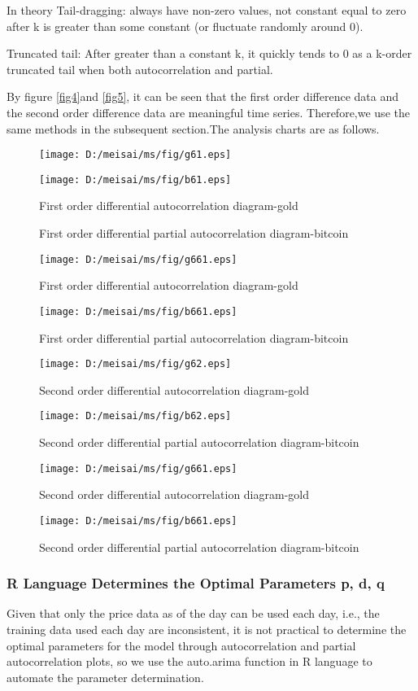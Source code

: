 \documentclass{mcmthesis}
\begin{document}
In theory
Tail-dragging: always have non-zero values, not constant equal to zero after k is greater than some constant (or fluctuate randomly around 0).

Truncated tail: After greater than a constant k, it quickly tends to 0 as a k-order truncated tail when both autocorrelation and partial.

By figure \ref{fig4}and \ref{fig5}, it can be seen that the first order difference data and the second order difference data are meaningful time series.
Therefore,we use the same methods in the subsequent section.The analysis charts are as follows.

\begin{figure}[htbp]
  \centering
  \texttt{[image: D:/meisai/ms/fig/g61.eps]}
  \caption{First order differential autocorrelation diagram-gold}
  \texttt{[image: D:/meisai/ms/fig/b61.eps]}
\end{figure}
\begin{figure}[htbp]
  \caption{First order differential partial autocorrelation diagram-bitcoin} 
  \texttt{[image: D:/meisai/ms/fig/g661.eps]}
  \caption{First order differential autocorrelation diagram-gold}
  \texttt{[image: D:/meisai/ms/fig/b661.eps]}
  \caption{First order differential partial autocorrelation diagram-bitcoin} 
\end{figure}

\begin{figure}[!h]
  \texttt{[image: D:/meisai/ms/fig/g62.eps]}
  \caption{Second order differential autocorrelation diagram-gold}
  \texttt{[image: D:/meisai/ms/fig/b62.eps]}
  \caption{Second order differential partial autocorrelation diagram-bitcoin} 
  \texttt{[image: D:/meisai/ms/fig/g661.eps]}
  \caption{Second order differential autocorrelation diagram-gold}
  \texttt{[image: D:/meisai/ms/fig/b661.eps]}
  \caption{Second order differential partial autocorrelation diagram-bitcoin} 
  \label{fig661}
\end{figure}


\subsubsection{R Language Determines the Optimal Parameters p, d, q}
Given that only the price data as of the day can be used each day, i.e., 
the training data used each day are inconsistent,
it is not practical to determine the optimal parameters for the model through autocorrelation and partial autocorrelation plots, 
so we use the auto.arima function in R language to automate the parameter determination.
\end{document}
